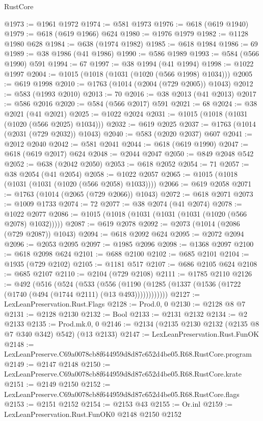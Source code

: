\begin{lexlean}{RustCore}
\begin{coremodule}
@1973 := @1961 @1972
@1974 := @581 @1973
@1976 := @618 (@619 @1940)
@1979 := @618 (@619 @1966) @624
@1980 := @1976 @1979
@1982 := @1128 @1980 @628
@1984 := @638 (@1974 @1982)
@1985 := @618 @1984
@1986 := 69
@1989 := @38 @1986 (@41 @1986)
@1990 := @586 @1989
@1993 := @584 (@566 @1990) @591
@1994 := 67
@1997 := @38 @1994 (@41 @1994)
@1998 := @1022 @1997
@2004 := @1015 (@1018 (@1031 (@1020 (@566 @1998) @1034)))
@2005 := @619 @1998
@2010 := @1763 (@1014 (@2004 (@729 @2005)) @1043)
@2012 := @583 (@1993 @2010)
@2013 := 70
@2016 := @38 @2013 (@41 @2013)
@2017 := @586 @2016
@2020 := @584 (@566 @2017) @591
@2021 := 68
@2024 := @38 @2021 (@41 @2021)
@2025 := @1022 @2024
@2031 := @1015 (@1018 (@1031 (@1020 (@566 @2025) @1034)))
@2032 := @619 @2025
@2037 := @1763 (@1014 (@2031 (@729 @2032)) @1043)
@2040 := @583 (@2020 @2037) @607
@2041 := @2012 @2040
@2042 := @581 @2041
@2044 := @618 (@619 @1990)
@2047 := @618 (@619 @2017) @624
@2048 := @2044 @2047
@2050 := @849 @2048 @542
@2052 := @638 (@2042 @2050)
@2053 := @618 @2052
@2054 := 71
@2057 := @38 @2054 (@41 @2054)
@2058 := @1022 @2057
@2065 := @1015 (@1018 (@1031 (@1031 (@1020 (@566 @2058) @1033))))
@2066 := @619 @2058
@2071 := @1763 (@1014 (@2065 (@729 @2066)) @1043)
@2072 := @618 @2071
@2073 := @1009 @1733
@2074 := 72
@2077 := @38 @2074 (@41 @2074)
@2078 := @1022 @2077
@2086 := @1015 (@1018 (@1031 (@1031 (@1031 (@1020 (@566 @2078) @1032)))))
@2087 := @619 @2078
@2092 := @2073 (@1014 (@2086 (@729 @2087)) @1043)
@2094 := @618 @2092 @624
@2095 := @2072 @2094
@2096 := @2053 @2095
@2097 := @1985 @2096
@2098 := @1368 @2097
@2100 := @618 @2098 @624
@2101 := @688 @2100
@2102 := @685 @2101
@2104 := @1935 (@729 @2102)
@2105 := @1181 @517
@2107 := @686 @2105 @624
@2108 := @685 @2107
@2110 := @2104 (@729 @2108)
@2111 := @1785 @2110
@2126 := @492
    (@516
      (@524
        (@533
          (@556 (@1190 (@1285 (@1337 (@1536 (@1722 (@1740 (@494 (@1744 @2111) (@13 @493))))))))))))
@2127 := LexLeanPreservation.Rust.Flags
@2128 := Prod.{0, 0}
@2130 := @2128 @8 @7
@2131 := @2128 @2130
@2132 := Bool
@2133 := @2131 @2132
@2134 := @2 @2133
@2135 := Prod.mk.{0, 0}
@2146 := @2134 (@2135 @2130 @2132 (@2135 @8 @7 @340 @342) @542) (@13 @2133)
@2147 := LexLeanPreservation.Rust.FunOK
@2148 := LexLeanPreserve.C69a0078cb8f644959d8d87c652d4be05.R68.RustCore.program
@2149 := @2147 @2148
@2150 := LexLeanPreserve.C69a0078cb8f644959d8d87c652d4be05.R68.RustCore.krate
@2151 := @2149 @2150
@2152 := LexLeanPreserve.C69a0078cb8f644959d8d87c652d4be05.R68.RustCore.flags
@2153 := @2151 @2152
@2154 := @2153 @43
@2155 := Or.inl
@2159 := LexLeanPreservation.Rust.FunOK0 @2148 @2150 @2152

\end{coremodule}
\end{lexlean}
